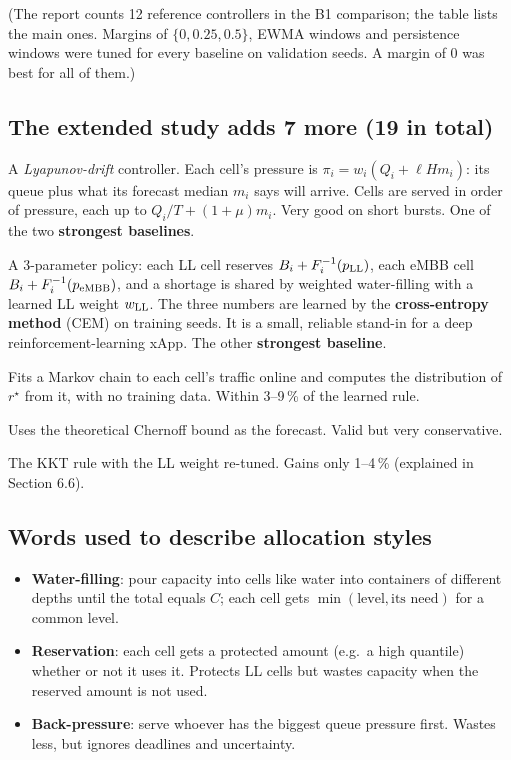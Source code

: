 \documentclass[11pt,a4paper]{article}
\newcommand{\rstar}{r^\star}
\begin{document}
(The report counts 12 reference controllers in the B1 comparison; the table lists the main ones. Margins of $\{0, 0.25, 0.5\}$, EWMA windows and persistence windows were tuned for every baseline on validation seeds. A margin of 0 was best for all of them.)

\subsection{The extended study adds 7 more (19 in total)}

\begin{description}[leftmargin=0.5cm,style=nextline]
  \item[Predictive MaxWeight (Huang et al.)] A \emph{Lyapunov-drift} controller. Each cell's pressure is $\pi_i = w_i(Q_i + \ell H m_i)$: its queue plus what its forecast median $m_i$ says will arrive. Cells are served in order of pressure, each up to $Q_i/T + (1+\mu)m_i$. Very good on short bursts. One of the two \textbf{strongest baselines}.
  \item[CEM class-level policy] A 3-parameter policy: each LL cell reserves $B_i + F_i^{-1}(p_{\rm LL})$, each eMBB cell $B_i + F_i^{-1}(p_{\rm eMBB})$, and a shortage is shared by weighted water-filling with a learned LL weight $w_{\rm LL}$. The three numbers are learned by the \textbf{cross-entropy method} (CEM) on training seeds. It is a small, reliable stand-in for a deep reinforcement-learning xApp. The other \textbf{strongest baseline}.
  \item[Markov-chain KKT] Fits a Markov chain to each cell's traffic online and computes the distribution of $\rstar$ from it, with no training data. Within 3--9\,\% of the learned rule.
  \item[Bound-quantile KKT] Uses the theoretical Chernoff bound as the forecast. Valid but very conservative.
  \item[Tuned-weight KKT] The KKT rule with the LL weight re-tuned. Gains only 1--4\,\% (explained in Section 6.6).
\end{description}

\subsection{Words used to describe allocation styles}

\begin{itemize}
  \item \textbf{Water-filling}: pour capacity into cells like water into containers of different depths until the total equals $C$; each cell gets $\min(\text{level}, \text{its need})$ for a common level.
  \item \textbf{Reservation}: each cell gets a protected amount (e.g.\ a high quantile) whether or not it uses it. Protects LL cells but wastes capacity when the reserved amount is not used.
  \item \textbf{Back-pressure}: serve whoever has the biggest queue pressure first. Wastes less, but ignores deadlines and uncertainty.
\end{itemize}
\end{document}
